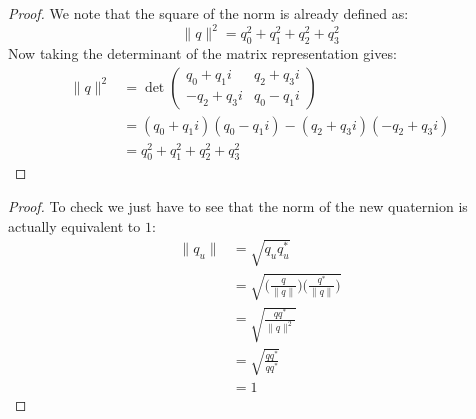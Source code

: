 \documentclass[12pt, letterpaper, onecolumn, conference, final]{IEEEtran}
\theoremstyle{definition}
\newtheorem{definition}{Definition}
\newtheorem{proposition}{Proposition}
\theoremstyle{plain}
\begin{document}
\begin{proof}
We note that the square of the norm is already defined as:
\begin{equation*}
\| q \|^2 = q_0^2 + q_1^2 + q_2^2 + q_3^2
\end{equation*}
Now taking the determinant of the matrix representation gives:
\begin{equation*}
\begin{split}
\| q \|^2 &= \det \begin{pmatrix}
q_0 + q_1i & q_2 + q_3i \\
-q_2 + q_3i & q_0 - q_1i
\end{pmatrix} \\
&= (q_0 + q_1i)(q_0 - q_1i) - (q_2 + q_3i)(-q_2 + q_3i) \\
&= q_0^2 + q_1^2 + q_2^2 + q_3^2
\end{split}
\end{equation*}
\end{proof}

\newpage
\begin{center}
\end{center}

\begin{center}
\end{center}

\begin{proof}
To check we just have to see that the norm of the new quaternion is actually equivalent to $1$:
\begin{equation*}
\begin{split}
\| q_u \| &= \sqrt{q_uq_u^*} \\
&= \sqrt{\Big( \frac{q}{\| q \|} \Big) \Big( \frac{q^*}{\| q \|} \Big)} \\
&= \sqrt{\frac{qq^*}{\| q \|^2}} \\
&= \sqrt{\frac{qq^*}{qq^*}} \\
&= 1
\end{split}
\end{equation*}
\end{proof}
\end{document}
